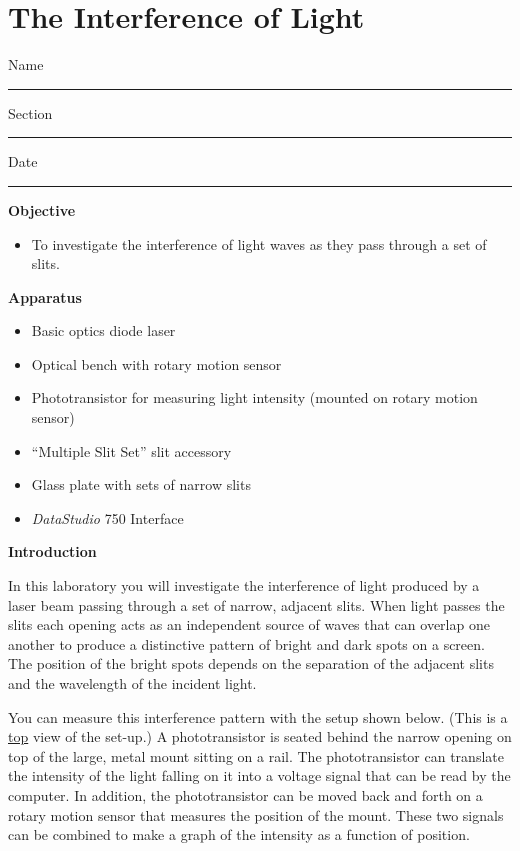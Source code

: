 
\section{The Interference of Light}

Name \rule{2.0in}{0.1pt}\hfill{}Section \rule{1.0in}{0.1pt}\hfill{}Date
\rule{1.0in}{0.1pt}

\textbf{Objective}

\begin{itemize}
\item To investigate the interference of light waves as they pass through
a set of slits. 
\end{itemize}
\textbf{Apparatus}

\begin{itemize}
\item Basic optics diode laser
\item Optical bench with rotary motion sensor
\item Phototransistor for measuring light intensity (mounted on rotary motion sensor)
\item ``Multiple Slit Set'' slit accessory
\item Glass plate with sets of narrow slits
\item {\it DataStudio} 750 Interface
\end{itemize}
\textbf{Introduction}

In this laboratory you will investigate the interference of light
produced by a laser beam passing through a set of narrow, adjacent
slits. When light passes the slits each opening acts as an independent
source of waves that can overlap one another to produce a distinctive
pattern of bright and dark spots on a screen. The position of the
bright spots depends on the separation of the adjacent slits and the
wavelength of the incident light. 

You can measure this interference pattern with the setup shown below. 
(This is a \underline{top} view of the set-up.) 
A phototransistor is seated behind the narrow opening on top of the large,
metal mount sitting on a rail. The phototransistor can translate the intensity 
of the light falling on it into a voltage signal that can be read by the
computer. In addition, the phototransistor can be moved back and
forth on a rotary motion sensor that measures the position of the 
mount. These two signals can be combined to
make a graph of the intensity as a function of position.

\vspace{0.3cm}
{\centering {} \par}
\vspace{0.3cm}

